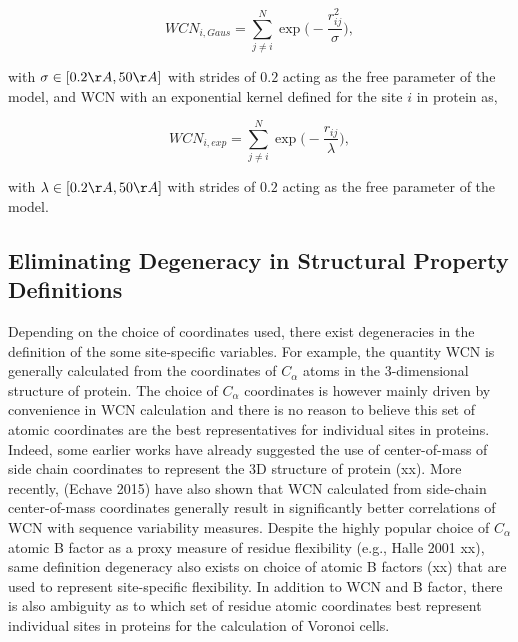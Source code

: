 \documentclass[11pt]{article}
\begin{document}
        \begin{equation}
            \label{eqn:wcn_gaus}
            WCN_{i,Gaus} = \sum^N_{j\neq i} \exp\bigg(-\frac{r_{ij}^2}{\sigma}\bigg),
        \end{equation}

        with $\sigma\in[0.2\AA,50\AA]$ with strides of $0.2$ acting as the free parameter of the model, and WCN with an exponential kernel defined for the site $i$ in protein as,

        \begin{equation}
            \label{eqn:wcn_exp}
            WCN_{i,exp} = \sum^N_{j\neq i} \exp\bigg(-\frac{r_{ij}}{\lambda}\bigg),
        \end{equation}

        with $\lambda\in[0.2\AA,50\AA]$ with strides of $0.2$ acting as the free parameter of the model.

    \subsection*{Eliminating Degeneracy in Structural Property Definitions}

        Depending on the choice of coordinates used, there exist degeneracies in the definition of the some site-specific variables. For example, the quantity WCN is generally calculated from the coordinates of $C_\alpha$ atoms in the 3-dimensional structure of protein. The choice of $C_\alpha$ coordinates is however mainly driven by convenience in WCN calculation and there is no reason to believe this set of atomic coordinates are the best representatives for individual sites in proteins. Indeed, some earlier works have already suggested the use of center-of-mass of side chain coordinates to represent the 3D structure of protein (xx). More recently, (Echave 2015) have also shown that WCN calculated from side-chain center-of-mass coordinates generally result in significantly better correlations of WCN with sequence variability measures. Despite the highly popular choice of $C_\alpha$ atomic B factor as a proxy measure of residue flexibility (e.g., Halle 2001 xx), same definition degeneracy also exists on choice of atomic B factors (xx) that are used to represent site-specific flexibility. In addition to WCN and B factor, there is also ambiguity as to which set of residue atomic coordinates best represent individual sites in proteins for the calculation of Voronoi cells. \\
\end{document}
